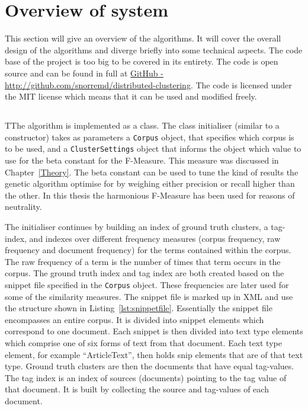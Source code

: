 \section{Overview of system}
This section will give an overview of the algorithms. It will cover the overall design of the algorithms and diverge briefly into some technical aspects. The code base of the project is too big to be covered in its entirety. The code is open source and can be found in full at \href{http://github.com/snorremd/distributed-clustering}{GitHub - http://github.com/snorremd/distributed-clustering}. The code is licensed under the MIT license which means that it can be used and modified freely.

\subsection{\CTC}
TThe \CTC algorithm is implemented as a class. The class initialiser (similar to a constructor) takes as parameters a \texttt{Corpus} object, that specifies which corpus is to be used, and a \texttt{ClusterSettings} object that informs the \CTC object which value to use for the beta constant for the F-Measure. This measure was discussed in Chapter~\ref{Theory}. The beta constant can be used to tune the kind of results the genetic algorithm optimise for by weighing either precision or recall higher than the other. In this thesis the harmonious F-Measure has been used for reasons of neutrality.

The initialiser continues by building an index of ground truth clusters, a tag-index, and indexes over different frequency measures (corpus frequency, raw frequency and document frequency) for the terms contained within the corpus. The raw frequency of a term is the number of times that term occurs in the corpus. The ground truth index and tag index are both created based on the snippet file specified in the \texttt{Corpus} object. These frequencies are later used for some of the similarity measures. The snippet file is marked up in XML and use the structure shown in Listing~\ref{lst:snippetfile}.
Essentially the snippet file encompasses an entire corpus. It is divided into snippet elements which correspond to one document. Each snippet is then divided into text type elements which comprise one of six forms of text from that document. Each text type element, for example ``ArticleText'', then holds snip elements that are of that text type. Ground truth clusters are then the documents that have equal tag-values. The tag index is an index of sources (documents) pointing to the tag value of that document. It is built by collecting the source and tag-values of each document.

